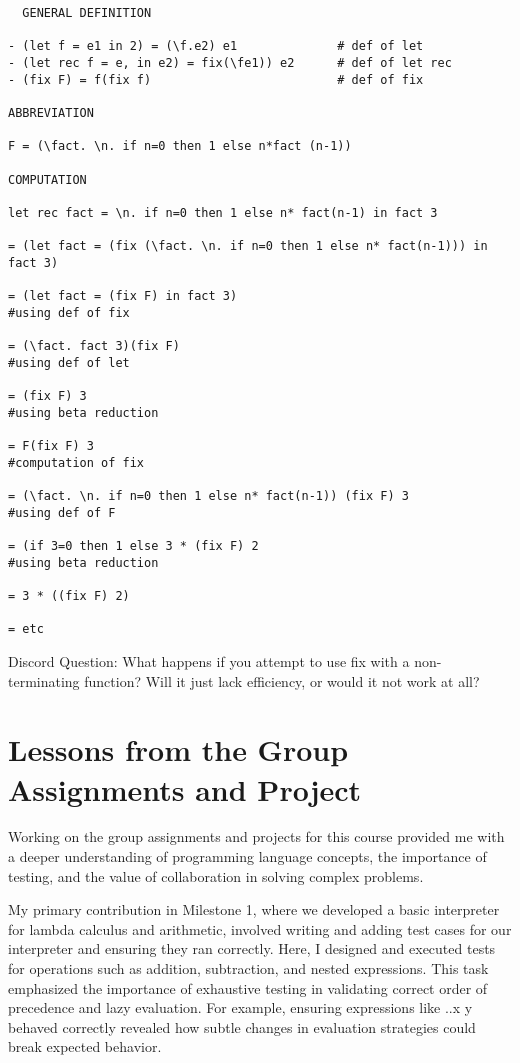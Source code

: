\documentclass{article}
\theoremstyle{theorem}
\theoremstyle{definition}
\theoremstyle{remark}
\begin{document}
\begin{verbatim}
  GENERAL DEFINITION

- (let f = e1 in 2) = (\f.e2) e1              # def of let
- (let rec f = e, in e2) = fix(\fe1)) e2      # def of let rec
- (fix F) = f(fix f)                          # def of fix

ABBREVIATION

F = (\fact. \n. if n=0 then 1 else n*fact (n-1))

COMPUTATION

let rec fact = \n. if n=0 then 1 else n* fact(n-1) in fact 3

= (let fact = (fix (\fact. \n. if n=0 then 1 else n* fact(n-1))) in fact 3) 

= (let fact = (fix F) in fact 3)                                             #using def of fix

= (\fact. fact 3)(fix F)                                                     #using def of let

= (fix F) 3                                                                  #using beta reduction

= F(fix F) 3                                                                 #computation of fix 

= (\fact. \n. if n=0 then 1 else n* fact(n-1)) (fix F) 3                     #using def of F

= (if 3=0 then 1 else 3 * (fix F) 2                                          #using beta reduction

= 3 * ((fix F) 2)

= etc
\end{verbatim}

Discord Question: What happens if you attempt to use fix with a non-terminating function? Will it just lack efficiency, or would it not work at all?

\section{Lessons from the Group Assignments and Project}

Working on the group assignments and projects for this course provided me with a deeper understanding of programming language concepts, the importance of testing, and the value of collaboration in solving complex problems.

My primary contribution in Milestone 1, where we developed a basic interpreter for lambda calculus and arithmetic, involved writing and adding test cases for our interpreter and ensuring they ran correctly. Here, I designed and executed tests for operations such as addition, subtraction, and nested expressions. This task emphasized the importance of exhaustive testing in validating correct order of precedence and lazy evaluation. For example, ensuring expressions like \x.\y.x y behaved correctly revealed how subtle changes in evaluation strategies could break expected behavior.
\end{document}
